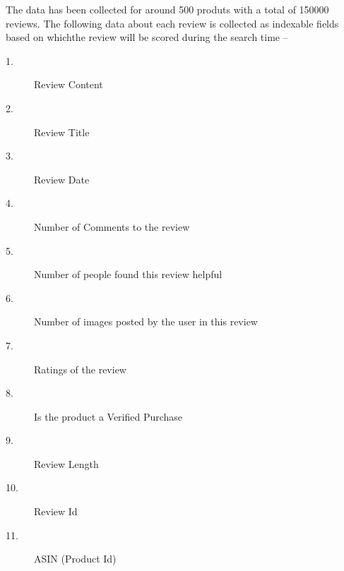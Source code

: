 \documentclass{article}
\begin{document}
The data has been collected for around 500 produts with a total of 150000 reviews. The following data about each review is collected as indexable fields based on whichthe review will be scored during the search time --

\begin{description}
	\item[1. ] Review Content
	\item[2. ] Review Title
	\item[3. ] Review Date
	\item[4. ] Number of Comments to the review
	\item[5. ] Number of people found this review helpful
	\item[6. ] Number of images posted by the user in this review
	\item[7. ] Ratings of the review 
	\item[8. ] Is the product a Verified Purchase
	\item[9. ] Review Length
	\item[10. ] Review Id
	\item[11. ] ASIN (Product Id)
\end{description}
\end{document}
